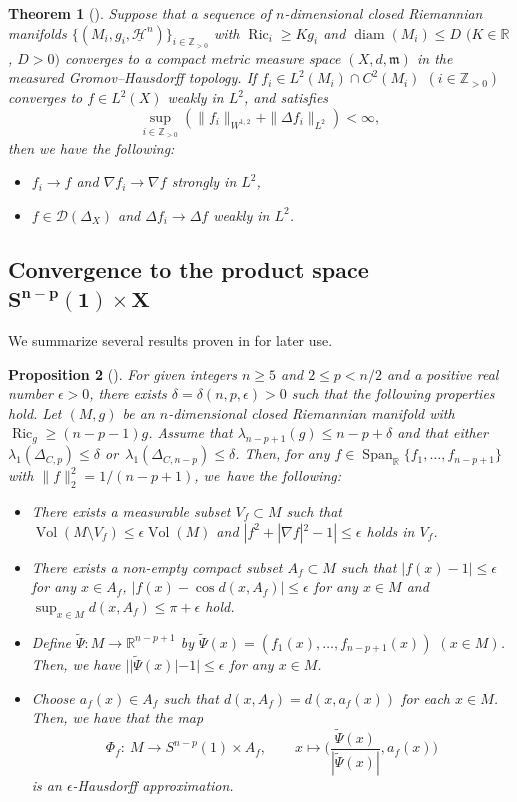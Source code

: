 \documentclass[10pt,a4paper]{amsart}
\numberwithin{equation}{section}
\newtheorem{Thm}{Theorem}[section]
\newtheorem{Prop}[Thm]{Proposition}
\theoremstyle{definition}
\newcommand{\Ric}{\operatorname{Ric}}
\newcommand{\Vol}{\operatorname{Vol}}
\newcommand{\diam}{\operatorname{diam}}
\newcommand{\Span}{\operatorname{Span}}
\newcommand{\R}{\mathbb{R}}
\newcommand{\Z}{\mathbb{Z}}
\newcommand{\mf}{\mathfrak{m}}
\newcommand{\nHa}{\underline{\mathcal{H}}}
\newcommand{\D}{\mathcal{D}}
\begin{document}
\begin{Thm}[{\cite[Theorem~1.3]{Ho1}}]\label{convf}
Suppose that a sequence of $n$-dimensional closed Riemannian manifolds $\{(M_i,g_i,\nHa^n)\}_{i\in \Z_{>0}}$ with $\Ric_i\geq K g_i$ and $\diam (M_i)\leq D$ $(K\in \R$, $D>0)$ converges to a compact metric measure space $(X,d,\mf)$ in the measured Gromov--Hausdorff topo\-logy.
If $f_i\in L^2(M_i)\cap C^2(M_i)$ $(i\in\Z_{>0})$ converges to $f\in L^2(X)$ weakly in $L^2$, and satisfies
\[
\sup_{i\in\Z_{>0}} \left(\|f_i\|_{W^{1,2}}+\|\Delta f_i\|_{L^2}\right)<\infty,
\]
then we have the following:
\begin{itemize}\itemsep=0pt
\item[$(i)$] $f_i \to f$ and $\nabla f_i\to \nabla f$ strongly in $L^2$,
\item[$(ii)$] $f\in \D(\Delta_X)$ and $\Delta f_i\to \Delta f$ weakly in $L^2$.
\end{itemize}
\end{Thm}


\subsection[Convergence to the product space S{n-p}(1) x X]{Convergence to the product space $\boldsymbol{S^{n-p}(1)\times X}$}
We summarize several results proven in \cite{Ai3} for later use.

\begin{Prop}[{\cite[Proposition~4.17, Lemma 4.22 and Theorem~4.47]{Ai3}}]\label{prev}
For given integers $n\geq 5$ and $2\leq p < n/2$ and a positive real number $\epsilon>0$, there exists $\delta=\delta(n,p,\epsilon)>0$ such that the following properties hold.
Let $(M,g)$ be an $n$-dimensional closed Riemannian manifold with $\Ric_g\geq (n-p-1)g$.
Assume that $\lambda_{n-p+1}(g)\leq n-p+\delta$ and that either
$\lambda_1(\Delta_{C,p})\leq \delta$ or~$\lambda_1(\Delta_{C,n-p})\leq \delta$.
Then, for any $f\in\Span_{\R}\{f_1,\ldots,f_{n-p+1}\}$ with $\|f\|_2^2=1/(n-p+1)$, we~have the following:
\begin{itemize}\itemsep=0pt
\item[$(i)$] There exists a measurable subset $V_f\subset M$ such that
$\Vol(M\setminus V_f)\leq \epsilon \Vol(M)$ and $|f^2+|\nabla f|^2-1|\leq \epsilon$ holds in $V_f$.
\item[$(ii)$] There exists a non-empty compact subset $A_f\subset M$ such that $|f(x)-1|\leq\epsilon$ for any $x\in A_f$, $|f(x)-\cos d(x,A_f)|\leq \epsilon$ for any $x\in M$ and $\sup_{x\in M} d(x,A_f)\leq \pi+\epsilon$ hold.
\item[$(iii)$] Define $\widetilde{\Psi}\colon M\to \R^{n-p+1}$ by $\widetilde{\Psi}(x)=(f_1(x),\ldots,f_{n-p+1}(x))$ $(x\in M)$.
Then, we have $||\widetilde{\Psi}(x)|-1|\leq \epsilon$ for any $x\in M$.
\item[$(iv)$] Choose $a_f(x)\in A_f$ such that
$d(x,A_f)=d(x,a_f(x))$ for each $x\in M$. Then, we have that the map
\[
\Phi_f \colon\ M\to S^{n-p}(1)\times A_f,\qquad
x\mapsto \bigg(\frac{\widetilde{\Psi}(x)}{|\widetilde{\Psi}(x)|}, a_f(x)\bigg)
\]
is an $\epsilon$-Hausdorff approximation.
\end{itemize}
\end{Prop}
\end{document}
